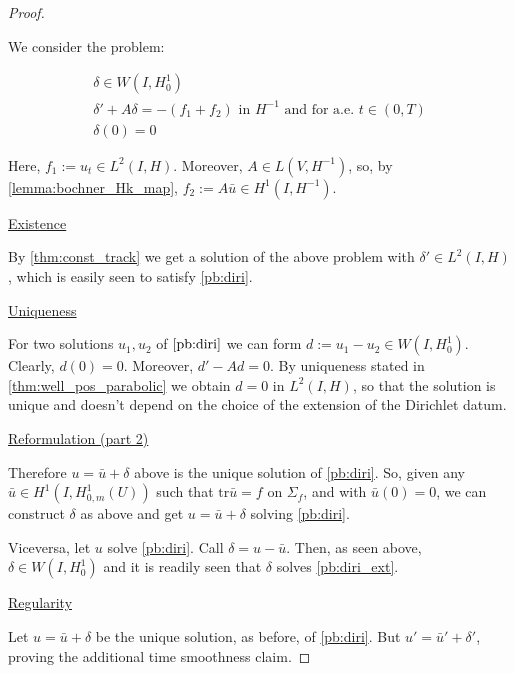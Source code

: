\documentclass[english,a4paper,9pt,oneside]{scrbook}	%
\theoremstyle{break}
\newenvironment{mproof}[1][\proofname]{%
  \begin{proof}[#1]$ $\par\nobreak\ignorespaces
}{%
  \end{proof}
}
\renewcommand*{\proofname}{Proof}
\theoremstyle{remark}
\newcommand{\tr}{\text{tr}}
\begin{document}
\begin{appendices}
\begin{mproof}
We consider the problem: 

\begin{align}
\delta \in W(I,H^1_0) \\
\delta' + A \delta = -(f_1+f_2) \text{ in }H^{-1} \text{ and for a.e. } t \in (0,T) \\
\delta(0)=0
\end{align}

Here, $f_1:= u_t \in L^2(I,H)$. Moreover, $A \in L(V, H^{-1})$, so, by \cref{lemma:bochner_Hk_map}, $f_2:=A\bar{u} \in H^1(I, H^{-1})$.

\underline{Existence}

By \cref{thm:const_track} we get a solution of the above problem with $\delta' \in L^2(I, H)$, which is easily seen to satisfy \cref{pb:diri}. 

\underline{Uniqueness}

For two solutions $u_1, u_2$ of $\cref{pb:diri}$ we can form $d:=u_1-u_2\in W(I,H^1_0)$. Clearly, $d(0)=0$. Moreover, $d' - Ad = 0$. 
By uniqueness stated in \cref{thm:well_pos_parabolic} we obtain $d=0$ in $L^2(I,H)$, so that the solution is unique and doesn't depend on the choice of the extension of the Dirichlet datum.

\underline{Reformulation (part 2)}

Therefore $u=\bar{u}+\delta$ above is the unique solution of \cref{pb:diri}. So, given any $\bar{u}\in H^1(I,H^1_{0,m}(U))$ such that $\tr \bar{u} =f$ on $\Sigma_f$, and with $\bar{u}(0)=0$, we can construct $\delta$ as above and get $u=\bar{u}+\delta$ solving \cref{pb:diri}.

Viceversa, let $u$ solve \cref{pb:diri}. Call $\delta = u- \bar{u}$. Then, as seen above, $\delta \in W(I,H^1_0)$ and it is readily seen that $\delta$ solves \cref{pb:diri_ext}.


\underline{Regularity}

Let $u=\bar{u}+\delta$ be the unique solution, as before, of \cref{pb:diri}. But $u' = \bar{u}'+\delta'$, proving the additional time smoothness claim.


\end{mproof}
\end{appendices}
\end{document}
